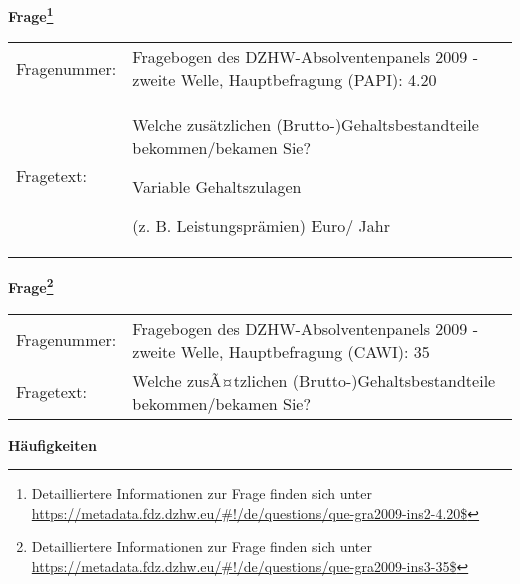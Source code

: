 				\vspace*{0.5cm}
                \noindent\textbf{Frage\footnote{Detailliertere Informationen zur Frage finden sich unter
		              \url{https://metadata.fdz.dzhw.eu/\#!/de/questions/que-gra2009-ins2-4.20$}}}\\
				\begin{tabularx}{\hsize}{@{}lX}
					Fragenummer: &
					  Fragebogen des DZHW-Absolventenpanels 2009 - zweite Welle, Hauptbefragung (PAPI):
					  4.20
 \\
					Fragetext: & Welche zusätzlichen (Brutto-)Gehaltsbestandteile bekommen/bekamen Sie?\par  Variable Gehaltszulagen\par  (z. B. Leistungsprämien) Euro/ Jahr \\
				\end{tabularx}
				\vspace*{0.5cm}
                \noindent\textbf{Frage\footnote{Detailliertere Informationen zur Frage finden sich unter
		              \url{https://metadata.fdz.dzhw.eu/\#!/de/questions/que-gra2009-ins3-35$}}}\\
				\begin{tabularx}{\hsize}{@{}lX}
					Fragenummer: &
					  Fragebogen des DZHW-Absolventenpanels 2009 - zweite Welle, Hauptbefragung (CAWI):
					  35
 \\
					Fragetext: & Welche zusÃ¤tzlichen (Brutto-)Gehaltsbestandteile bekommen/bekamen Sie? \\
				\end{tabularx}





        		\vspace*{0.5cm}
                \noindent\textbf{Häufigkeiten}

